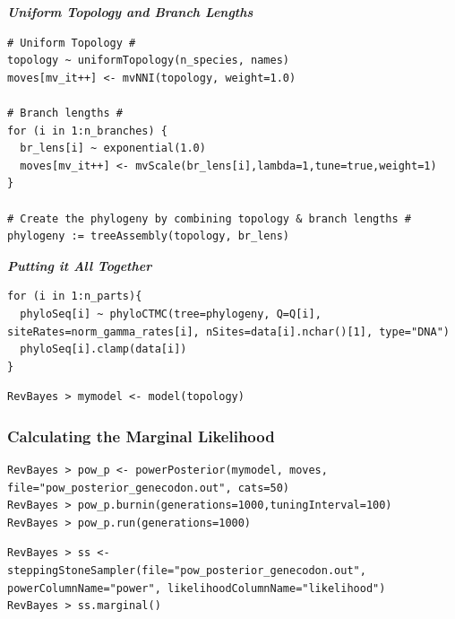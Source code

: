 \documentclass[11pt]{article}
\begin{document}
\textbf{\textit{Uniform Topology and Branch Lengths}}

{\tt \begin{snugshade*}
\begin{lstlisting}
# Uniform Topology #
topology ~ uniformTopology(n_species, names)
moves[mv_it++] <- mvNNI(topology, weight=1.0)

# Branch lengths #
for (i in 1:n_branches) {
  br_lens[i] ~ exponential(1.0)
  moves[mv_it++] <- mvScale(br_lens[i],lambda=1,tune=true,weight=1) 
}

# Create the phylogeny by combining topology & branch lengths #
phylogeny := treeAssembly(topology, br_lens)
\end{lstlisting}
\end{snugshade*}}

\textbf{\textit{Putting it All Together}}

{\tt \begin{snugshade*}
\begin{lstlisting}
for (i in 1:n_parts){
  phyloSeq[i] ~ phyloCTMC(tree=phylogeny, Q=Q[i], siteRates=norm_gamma_rates[i], nSites=data[i].nchar()[1], type="DNA")
  phyloSeq[i].clamp(data[i])
}
\end{lstlisting}
\end{snugshade*}}


{\tt \begin{snugshade*}
\begin{lstlisting}
RevBayes > mymodel <- model(topology)
\end{lstlisting}
\end{snugshade*}}


\subsubsection*{Calculating the Marginal Likelihood}

{\tt \begin{snugshade*}
\begin{lstlisting}
RevBayes > pow_p <- powerPosterior(mymodel, moves, file="pow_posterior_genecodon.out", cats=50) 
RevBayes > pow_p.burnin(generations=1000,tuningInterval=100)
RevBayes > pow_p.run(generations=1000)  
\end{lstlisting}
\end{snugshade*}}

{\tt \begin{snugshade*}
\begin{lstlisting}
RevBayes > ss <- steppingStoneSampler(file="pow_posterior_genecodon.out", powerColumnName="power", likelihoodColumnName="likelihood")
RevBayes > ss.marginal() 
\end{lstlisting}
\end{snugshade*}}
\end{document}
